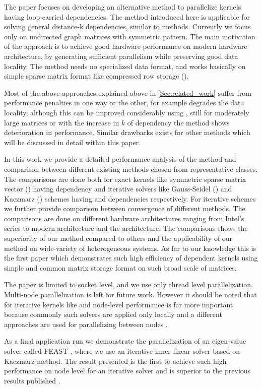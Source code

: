 The paper focuses on developing an alternative method to parallelize kernels having loop-carried dependencies. The method introduced here is applicable for solving general distance-k dependencies, similar to \MCfull methods. Currently we focus only on undirected graph \ie matrices with symmetric pattern. The main motivation of the approach is to achieve good hardware performance on modern hardware architecture, by generating sufficient parallelism while preserving good data locality. The method needs no specialized data format, and works basically on simple sparse matrix format like compressed row storage (\CRS).

Most of the above approaches explained above in \cref{Sec:related_work} suffer from performance penalties in one way or the other, for example \MCfull degrades the data locality, although this can be improved considerably using \ABMCfull, still for moderately large matrices or with the increase in $k$ of \DK dependency the method shows deterioration in performance. Similar drawbacks exists for other methods which will be discussed in detail within this paper.

In this work we provide a detailed performance analysis of the method and comparison between different existing methods chosen from representative classes. The comparisons are done both for exact kernels like symmetric sparse matrix vector (\SymmSpmv) having \DTWO dependency and iterative solvers like Gauss-Seidel (\GS) and Kaczmarz (\KACZ) schemes having \DONE and \DTWO dependencies respectively. For iterative schemes we further provide comparison between convergence of different methods. The comparisons are done on different hardware architectures ranging from Intel's \IVB series to modern \SKX architecture and the \AMD \EPY architecture. The comparisons shows the superiority of our method compared to others and the applicability of our method on wide-variety of heterogeneous systems. As far to our knowledge this is the first paper which demonstrates such high efficiency of \DTWO dependent kernels using simple and common \CRS matrix storage format on such broad scale of matrices.

The paper is limited to socket level, and we use only thread level parallelization. Multi-node parallelization is left for future work. However it should be noted that for iterative kernels like \KACZ and \GS node-level performance is far more important because commonly such solvers are applied only locally and a different approaches are used for parallelizing between nodes \cite{hpcg,CARP}.


As a final application run we demonstrate the parallelization of an eigen-value solver called FEAST \cite{FEAST}, where we use an iterative inner linear solver based on Kaczmarz method. The result presented is the first to achieve such high performance on node level for an iterative solver and is superior to the previous results published \cite{feast_mc}.
